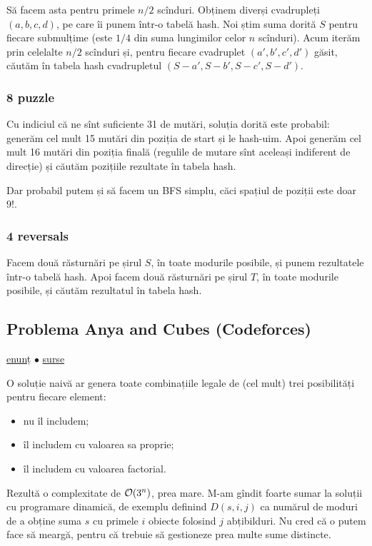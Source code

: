 \documentclass[../main.tex]{subfiles}
\begin{document}
Să facem asta pentru primele $n/2$ scînduri. Obținem diverși cvadrupleți $(a, b, c, d)$, pe care îi punem într-o tabelă hash. Noi știm suma dorită $S$ pentru fiecare submulțime (este $1/4$ din suma lungimilor celor $n$ scînduri). Acum iterăm prin celelalte $n/2$ scînduri și, pentru fiecare cvadruplet $(a', b', c', d')$ găsit, căutăm în tabela hash cvadrupletul $(S - a', S - b', S - c', S - d')$.

\subsubsection*{8 puzzle}

Cu indiciul că ne sînt suficiente 31 de mutări, soluția dorită este probabil: generăm cel mult 15 mutări din poziția de start și le hash-uim. Apoi generăm cel mult 16 mutări din poziția finală (regulile de mutare sînt aceleași indiferent de direcție) și căutăm pozițiile rezultate în tabela hash.

Dar probabil putem și să facem un BFS simplu, căci spațiul de poziții este doar $9!$.

\subsubsection*{4 reversals}

Facem două răsturnări pe șirul $S$, în toate modurile posibile, și punem rezultatele într-o tabelă hash. Apoi facem două răsturnări pe șirul $T$, în toate modurile posibile, și căutăm rezultatul în tabela hash.


\subsection{Problema Anya and Cubes (Codeforces)}
\label{problem:anya-and-cubes}

\href{https://codeforces.com/contest/525/problem/E}{enunț}
$\bullet$
\hyperref[code:anya-and-cubes]{surse}

O soluție naivă ar genera toate combinațiile legale de (cel mult) trei posibilități pentru fiecare element:

\begin{itemize}
  \item nu îl includem;
  \item îl includem cu valoarea sa proprie;
  \item îl includem cu valoarea factorial.
\end{itemize}

Rezultă o complexitate de $\mathcal{O}(3^n)$, prea mare. M-am gîndit foarte sumar la soluții cu programare dinamică, de exemplu definind $D(s, i, j)$ ca numărul de moduri de a obține suma $s$ cu primele $i$ obiecte folosind $j$ abțibilduri. Nu cred că o putem face să meargă, pentru că trebuie să gestioneze prea multe sume distincte.
\end{document}
